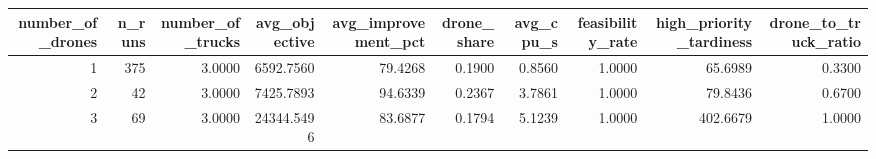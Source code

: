 \begin{tabular}{rrrrrrrrrr}
\toprule
number_of_drones & n_runs & number_of_trucks & avg_objective & avg_improvement_pct & drone_share & avg_cpu_s & feasibility_rate & high_priority_tardiness & drone_to_truck_ratio \\
\midrule
1 & 375 & 3.0000 & 6592.7560 & 79.4268 & 0.1900 & 0.8560 & 1.0000 & 65.6989 & 0.3300 \\
2 & 42 & 3.0000 & 7425.7893 & 94.6339 & 0.2367 & 3.7861 & 1.0000 & 79.8436 & 0.6700 \\
3 & 69 & 3.0000 & 24344.5496 & 83.6877 & 0.1794 & 5.1239 & 1.0000 & 402.6679 & 1.0000 \\
\bottomrule
\end{tabular}
